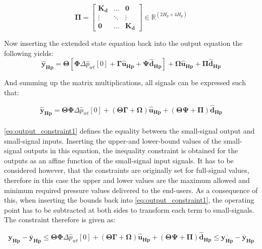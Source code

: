  \begin{equation}
 \bm{\Pi} =
 \begin{bmatrix}
 \bm{K_d} & \hdots & \bm{0} \\
 \vdots & \ddots & \vdots\\
 \bm{0} & \hdots & \bm{K_d} 
 \end{bmatrix}
 \in \pmb{\mathbb{R}}^{(2 H_p \times 4 H_p)}
 \end{equation}


Now inserting the extended state equation back into the output equation the following yields: 
\begin{equation}
	\bm{\hat{y}_{Hp}} = \bm{\Theta} [\bm{\Phi} \Delta \hat{p}_{wt}[0] + \bm{\Gamma} \bm{\hat{u}_{Hp}} + \bm{\Psi} \bm{\hat{d}_{Hp}}] + \bm{\Omega} \bm{\hat{u}_{Hp}} + \bm{\Pi} \bm{\hat{d}_{Hp}}
\end{equation}

And summing up the matrix multiplications, all signals can be expressed such that: 

\begin{equation}
	\bm{\hat{y}_{Hp}} = \bm{\Theta} \bm{\Phi} \Delta \hat{p}_{wt}[0] +  (\bm{\Theta} \bm{\Gamma}+ \bm{\Omega}) \bm{\hat{u}_{Hp}} + (\bm{\Theta} \bm{\Psi} + \bm{\Pi})  \bm{\hat{d}_{Hp}}
	\label{eq:output_constraint1}
\end{equation}
\\
\eqref{eq:output_constraint1} defines the equality between the small-signal output and small-signal inputs. Inserting the upper-and lower-bound values of the small-signal outputs in this equation, the inequality constraint is obtained for the outputs as an affine function of the small-signal input signals. It has to be considered however, that the constraints are originally set for full-signal values, therefore in this case the upper and lower values are the maximum allowed and minimum required pressure values delivered to the end-users. As a consequence of this, when inserting the bounds back into \eqref{eq:output_constraint1}, the operating point has to be subtracted at both sides to transform each term to small-signals. The constraint therefore is given as: 

\begin{equation}
	\underline{\bm{y_{Hp}}} - \bm{\bar{y}_{Hp}} \leq \bm{\Theta} \bm{\Phi} \Delta \hat{p}_{wt}[0] +  (\bm{\Theta} \bm{\Gamma}+ \bm{\Omega}) \bm{\hat{u}_{Hp}} + (\bm{\Theta} \bm{\Psi} + \bm{\Pi})  \bm{\hat{d}_{Hp}} \leq \overline{\bm{y_{Hp}}} - \bm{\bar{y}_{Hp}}
	\label{eq:output_constraint2}
\end{equation}

